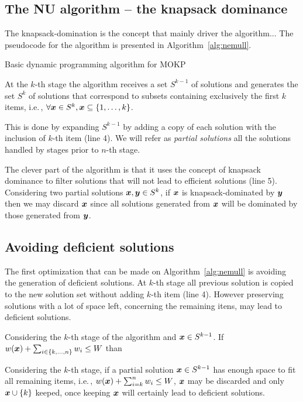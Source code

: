 \subsection{The NU algorithm -- the knapsack dominance}
The knapsack-domination is the concept that mainly driver the algorithm...
The pseudocode for the algorithm is presented in Algorithm~\ref{alg:nemull}.
\begin{algorithm}
  \caption{Basic dynamic programming algorithm for MOKP}
  \label{alg:nemull}
  
\end{algorithm}
At the $k$-th stage the algorithm receives a set $S^{k-1}$ of solutions and
generates the set $S^k$ of solutions that correspond
to subsets containing exclusively the first $k$ items, i.e.\,,
$\forall\boldsymbol{x} \in S^k, \boldsymbol{x} \subseteq \{1, \ldots, k\}$.

This is done by expanding $S^{k-1}$ by adding a copy of each solution with the
inclusion of $k$-th item (line 4).
We will refer as \emph{partial solutions} all the solutions handled by
stages prior to $n$-th stage.

The clever part of the algorithm is that it uses the concept of knapsack dominance
to filter solutions that will not lead to efficient solutions (line 5).
Considering two partial solutions $\boldsymbol{x}, \boldsymbol{y} \in S^k$, if
$\boldsymbol{x}$ is knapsack-dominated by $\boldsymbol{y}$ then we may discard $\boldsymbol{x}$ since all
solutions generated from $\boldsymbol{x}$ will be dominated by those generated from $\boldsymbol{y}$.


\subsection{Avoiding deficient solutions}

The first optimization that can be made on Algorithm~\ref{alg:nemull} is
avoiding the generation of deficient solutions.
At $k$-th stage all previous solution is copied to the
new solution set without adding $k$-th item (line 4).
However preserving solutions with a lot of space left, concerning the remaining itens,
may lead to deficient solutions.

\begin{theorem}
   Considering the $k$-th stage of the algorithm and $\boldsymbol{x} \in S^{k-1}$.
   If $w(\boldsymbol{x}) + \sum_{i \in {\{k, \ldots, n\}}} w_i \leq W$ than
\end{theorem}

Considering the $k$-th stage, if a partial solution $\boldsymbol{x} \in S^{k-1}$ has enough
space to fit all remaining items, i.e.\,, $w(\boldsymbol{x}) + \sum_{i=k}^n w_i \leq W$,
$\boldsymbol{x}$ may be discarded and only $\boldsymbol{x} \cup \{k\}$ keeped, once
keeping $\boldsymbol{x}$ will certainly lead to deficient solutions.

